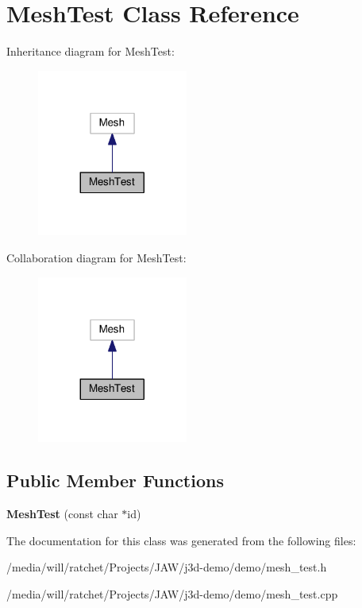 \hypertarget{classMeshTest}{}\section{Mesh\+Test Class Reference}
\label{classMeshTest}


Inheritance diagram for Mesh\+Test\+:
\nopagebreak
\begin{figure}[H]
\begin{center}
\leavevmode
\includegraphics[width=140pt]{classMeshTest__inherit__graph}
\end{center}
\end{figure}


Collaboration diagram for Mesh\+Test\+:
\nopagebreak
\begin{figure}[H]
\begin{center}
\leavevmode
\includegraphics[width=140pt]{classMeshTest__coll__graph}
\end{center}
\end{figure}
\subsection*{Public Member Functions}
\begin{DoxyCompactItemize}
\item 
\hypertarget{classMeshTest_aca09ed80b9c3ee0daf802a0b631903e2}{}{\bfseries Mesh\+Test} (const char $\ast$id)\label{classMeshTest_aca09ed80b9c3ee0daf802a0b631903e2}

\end{DoxyCompactItemize}


The documentation for this class was generated from the following files\+:\begin{DoxyCompactItemize}
\item 
/media/will/ratchet/\+Projects/\+J\+A\+W/j3d-\/demo/demo/mesh\+\_\+test.\+h\item 
/media/will/ratchet/\+Projects/\+J\+A\+W/j3d-\/demo/demo/mesh\+\_\+test.\+cpp\end{DoxyCompactItemize}
